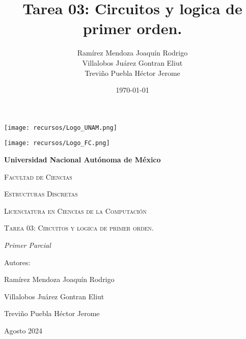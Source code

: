 \documentclass[oneside]{book}
\title{Tarea 03: Circuitos y logica de primer orden.}
\author{Ramírez Mendoza Joaquín Rodrigo\\
Villalobos Juárez Gontran Eliut\\
Treviño Puebla Héctor Jerome}
\date{\today}
\begin{document}
\begin{titlepage}
	\begin{minipage}{3cm}
		\begin{center}
			\texttt{[image: recursos/Logo\_UNAM.png]}\par
		\end{center}
	\end{minipage}\hfill
	\begin{minipage}{10cm}

	\end{minipage}\hfill
	\begin{minipage}{3cm}
		\begin{center}
			\texttt{[image: recursos/Logo\_FC.png]}\par
		\end{center}
	\end{minipage}
	\centering
	\vspace{1cm}

	{\bfseries\LARGE Universidad Nacional Autónoma de México \par}

	\vspace{1cm}
	{\scshape\Large Facultad de Ciencias \par}
	\vspace{1cm}
	{\scshape\Large Estructuras Discretas \par}
	\vspace{1cm}
	{\scshape\Large Licenciatura en Ciencias de la Computación \par}
	\vspace{1cm}
	{\scshape\Huge Tarea 03: Circuitos y logica de primer orden.  \par}
	\vspace{3cm}
	{\itshape\Large Primer Parcial \par}
	\vfill
	{\Large Autores: \par}
	{\Large Ramírez Mendoza Joaquín Rodrigo \par}
	{\Large Villalobos Juárez Gontran Eliut\par}
	{\Large Treviño Puebla Héctor Jerome \par}
	\vfill
	{\Large Agosto 2024 \par}
\end{titlepage}
\maketitle

\newpage
\newpage
\newpage
\newpage
\newpage
\end{document}
